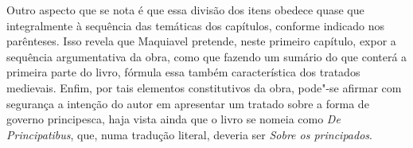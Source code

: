 { Outro aspecto que se nota é que essa divisão dos itens obedece quase
  que integralmente à sequência das temáticas dos capítulos, conforme
  indicado nos parênteses. Isso revela que Maquiavel pretende, neste
  primeiro capítulo, expor a sequência argumentativa da obra, como que
  fazendo um sumário do que conterá a primeira parte do livro, fórmula
  essa também característica dos tratados medievais. Enfim, por tais
  elementos constitutivos da obra, pode"-se afirmar com segurança a
  intenção do autor em apresentar um tratado sobre a forma de governo
  principesca, haja vista ainda que o livro se nomeia como \emph{De
  Principatibus}, que, numa tradução literal, deveria ser \emph{Sobre os
  principados}.}
%


